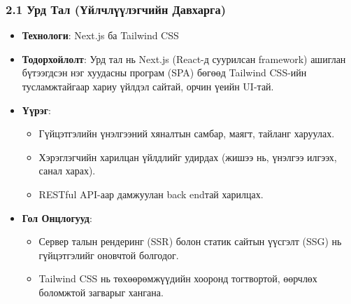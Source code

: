 \subsubsection*{2.1 Урд Тал (Үйлчлүүлэгчийн Давхарга)}
\begin{itemize}
    \item \textbf{Технологи}: Next.js ба Tailwind CSS
    \item \textbf{Тодорхойлолт}: Урд тал нь Next.js (React-д суурилсан framework) ашиглан бүтээгдсэн нэг хуудасны програм (SPA) бөгөөд Tailwind CSS-ийн тусламжтайгаар хариу үйлдэл сайтай, орчин үеийн UI-тай.
    \item \textbf{Үүрэг}:
    \begin{itemize}
        \item Гүйцэтгэлийн үнэлгээний хяналтын самбар, маягт, тайланг харуулах.
        \item Хэрэглэгчийн харилцан үйлдлийг удирдах (жишээ нь, үнэлгээ илгээх, санал харах).
        \item RESTful API-аар дамжуулан back endтай харилцах.
    \end{itemize}
    \item \textbf{Гол Онцлогууд}:
    \begin{itemize}
        \item Сервер талын рендеринг (SSR) болон статик сайтын үүсгэлт (SSG) нь гүйцэтгэлийг оновчтой болгодог.
        \item Tailwind CSS нь төхөөрөмжүүдийн хооронд тогтвортой, өөрчлөх боломжтой загварыг хангана.
    \end{itemize}
\end{itemize}

